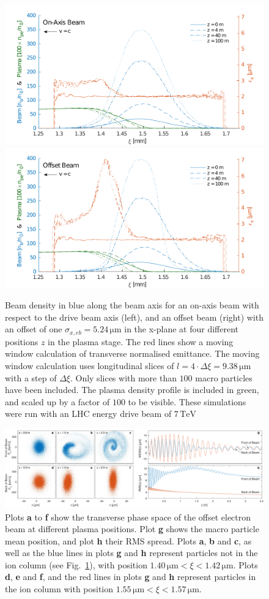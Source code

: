 \documentclass[aps,prstab,reprint,amsmath,amssymb,groupedaddress]{revtex4-1}
\newcommand{\unit}[1]{\,\mathrm{#1}}
\begin{document}
\begin{figure}[hbt]
    \includegraphics[width=0.495\linewidth,trim={2mm 0mm 2mm 0mm},clip]{figures/beamEmittance}
    \includegraphics[width=0.495\linewidth,trim={2mm 0mm 2mm 0mm},clip]{figures/beamEmittanceOffset}
    \caption{\label{Fig:BeamEmitt} Beam density in blue along the beam axis for an on-axis beam with respect to the drive beam axis (left), and an offset beam (right) with an offset of one $\sigma_{x,eb} = 5.24\unit{\mu m}$ in the x-plane \textendash at four different positions $z$ in the plasma stage. The red lines show a moving window calculation of transverse normalised emittance. The moving window calculation uses longitudinal slices of $l = 4\cdot\Delta\xi = 9.38\unit{\mu m}$ with a step of $\Delta\xi$. Only slices with more than $100$ macro particles have been included. The plasma density profile is included in green, and scaled up by a factor of $100$ to be visible. These simulations were run with an LHC energy drive beam of $7\unit{TeV}$}
\end{figure}

\begin{figure}[hbt]
    \includegraphics[width=\linewidth,trim={0mm 0mm 0mm 0mm},clip]{figures/beamFilamentationAll}
    \caption{\label{Fig:BeamFilament} Plots \textbf{a} to \textbf{f} show the transverse phase space of the offset electron beam at different plasma positions. Plot \textbf{g} shows the macro particle mean position, and plot \textbf{h} their RMS spread. Plots \textbf{a}, \textbf{b} and \textbf{c}, as well as the blue lines in plots \textbf{g} and \textbf{h} represent particles not in the ion column (see Fig.~\ref{Fig:BeamEmitt}), with position $1.40\unit{\mu m} < \xi < 1.42\unit{\mu m}$. Plots \textbf{d}, \textbf{e} and \textbf{f}, and the red lines in plots \textbf{g} and \textbf{h} represent particles in the ion column with position $1.55\unit{\mu m} < \xi < 1.57\unit{\mu m}$.}
\end{figure}
\end{document}
